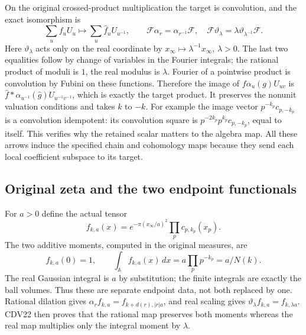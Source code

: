 \documentclass[11pt,a4paper]{article}
\theoremstyle{definition}\newtheorem{definition}[theorem]{Definition}
\begin{document}
On the original crossed-product multiplication the target is
convolution, and the exact isomorphism is
\begin{equation}\tag{CDV20}
 \sum_u f_uU_u\longmapsto\sum_u\widehat f_uU_{u^{-1}},\qquad
 \mathcal F\alpha_r=\alpha_{r^{-1}}\mathcal F,
 \quad\mathcal F\vartheta_\lambda
                  =\lambda\vartheta_{\lambda^{-1}}\mathcal F.
\end{equation}
Here $\vartheta_\lambda$ acts only on the real coordinate by
$x_\infty\mapsto\lambda^{-1}x_\infty$, $\lambda>0$.
The last two equalities follow by change of variables in the Fourier
integrals; the rational product of moduli is $1$, the real modulus
is $\lambda$. Fourier of a pointwise product is convolution by
Fubini on these functions. Therefore the image of
$f\alpha_u(g)U_{uv}$ is
$\widehat f*\alpha_{u^{-1}}(\widehat g)U_{u^{-1}v^{-1}}$,
which is exactly the target product. It preserves the nonunit
valuation conditions and takes $k$ to $-k$.
For example the image vector $p^{-k_p}c_{p,-k_p}$ is a
convolution idempotent: its convolution square is
$p^{-2k_p}p^{k_p}c_{p,-k_p}$, equal to itself. This verifies
why the retained scalar matters to the algebra map.
All these arrows induce the specified chain and cohomology maps
because they send each local coefficient subspace to its target.

\subsection{Original zeta and the two endpoint functionals}

For $a>0$ define the actual tensor
\begin{equation}\tag{CDV21}
 f_{k,a}(x)=e^{-\pi(x_\infty/a)^2}\prod_p c_{p,k_p}(x_p).
\end{equation}
The two additive moments, computed in the original measures, are
\begin{equation}\tag{CDV22}
 f_{k,a}(0)=1,\qquad \int_{\mathbb A}f_{k,a}(x)\,dx
                         =a\prod_pp^{-k_p}=a/N(k).
\end{equation}
The real Gaussian integral is $a$ by substitution; the finite
integrals are exactly the ball volumes. Thus these are separate
endpoint data, not both replaced by one. Rational dilation gives
$\alpha_rf_{k,a}=f_{k+d(r),|r|a}$, and real scaling gives
$\vartheta_\lambda f_{k,a}=f_{k,\lambda a}$. CDV22 then proves
that the rational map preserves both moments whereas the real map
multiplies only the integral moment by $\lambda$.
\end{document}
